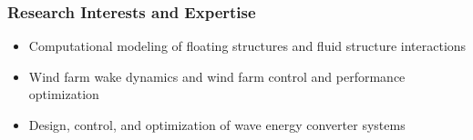 \documentclass[10pt]{article}
\begin{document}
\begin{enumerate}[leftmargin=1.5pc,itemsep=0pt,parsep=0pt,topsep=0pt,partopsep=1pt]

\end{enumerate}

\vspace{-0.2in}
\subsubsection*{Research Interests and Expertise}
\vspace{-0.1in}
\begin{itemize}  \itemsep1pt \parskip0pt 
\item Computational modeling of floating structures and fluid structure interactions
\item Wind farm wake dynamics and wind farm control and performance optimization
\item Design, control, and optimization of wave energy converter systems
\end{itemize}
\end{document}
